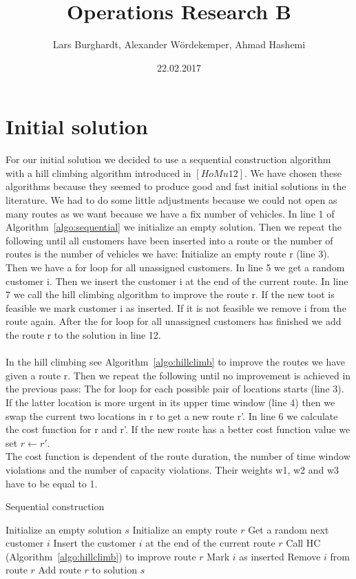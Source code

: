 \documentclass[fleqn]{scrartcl}
\title{Operations Research B}
\author{Lars Burghardt, Alexander Wördekemper, Ahmad Hashemi}
\date{22.02.2017}
\begin{document}
\maketitle
\tableofcontents
\section{Initial solution}

For our initial solution we decided to use a sequential construction algorithm with a hill climbing algorithm introduced in $[HoMu 12]$. We have chosen these algorithms because they seemed to produce good and fast initial solutions in the literature. We had to do some little adjustments because we could not open as many routes as we want because we have a fix number of vehicles. In line 1 of Algorithm~\ref{algo:sequential} we initialize an empty solution. Then we repeat the following until all customers have been inserted into a route or the number of routes is the number of vehicles we have: Initialize an empty route r (line 3). Then we have a for loop for all unassigned customers. In line 5 we get a random customer i. Then we insert the customer i at the end of the current route. In line 7 we call the hill climbing algorithm to improve the route r. If the new toot is feasible we mark customer i as inserted. If it is not feasible we remove i from the route again. After the for loop for all unassigned customers has finished we add the route r to the solution in line 12.
\\
\\  
In the hill climbing see Algorithm~\ref{algo:hillclimb} to improve the routes we have given a route r. Then we repeat the following until no improvement is achieved in the previous pass: The for loop for each possible pair of locations starts (line 3). If the latter location is more urgent in its upper time window (line 4) then we swap the current two locations in r to get a new route r'. In line 6 we calculate the cost function for r and r'. If the new route has a better cost function value we set $r\gets r'$.\\
The cost function is dependent of the route duration, the number of time window violations and the number of capacity violations. Their weights w1, w2 and w3 have to be equal to 1.

\begin{algorithm}
\caption{Sequential construction}
\label{algo:sequential}
\begin{algorithmic}[1]
\State Initialize an empty solution $s$
\Repeat
\State Initialize an empty route $r$
\State Get a random next customer $i$
\State Insert the customer $i$ at the end of the current route $r$
\State Call HC (Algorithm~\ref{algo:hillclimb}) to improve route $r$
\State Mark $i$ as inserted
\Else
\State Remove $i$ from route $r$
\EndIf
\EndFor
\State Add route $r$ to solution $s$
\end{algorithmic}
\end{algorithm}
\end{document}
